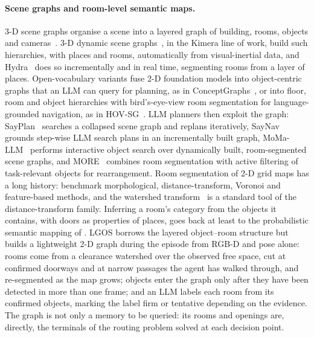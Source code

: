\documentclass[10pt]{article}
\newcommand{\ours}{LGOS\xspace}
\begin{document}
\paragraph{Scene graphs and room-level semantic maps.}
3-D scene graphs organise a scene into a layered graph of building, rooms, objects and
cameras~\citep{armeni20193d}. 3-D dynamic scene graphs~\citep{rosinol20203d}, in the Kimera line of work,
build such hierarchies, with places and rooms, automatically from visual-inertial data, and
Hydra~\citep{hughes2022hydra} does so
incrementally and in real time, segmenting rooms from a layer of places. Open-vocabulary variants fuse 2-D
foundation models into object-centric graphs that an LLM can query for planning, as in
ConceptGraphs~\citep{gu2024conceptgraphs}, or into floor, room and object hierarchies with bird's-eye-view
room segmentation for language-grounded navigation, as in HOV-SG~\citep{werby2024hierarchical}. LLM
planners then exploit the graph: SayPlan~\citep{rana2023sayplan} searches a collapsed scene graph and
replans iteratively, SayNav~\citep{rajvanshi2024saynav} grounds step-wise LLM search plans in an
incrementally built graph, MoMa-LLM~\citep{honerkamp2024language} performs interactive object search over
dynamically built, room-segmented scene graphs, and MORE~\citep{mohammadi2025more} combines room
segmentation with active filtering of task-relevant objects for rearrangement. Room segmentation of 2-D
grid maps has a long history: \citet{bormann2016room} benchmark morphological, distance-transform, Voronoi
and feature-based methods, and the watershed transform~\citep{vincent1991watersheds} is a standard tool of
the distance-transform family. Inferring a room's category from the objects it contains, with doors as
properties of places, goes back at least to the probabilistic semantic mapping of
\citet{pronobis2012large}. \ours borrows the layered object--room structure but builds a lightweight 2-D
graph during the episode from RGB-D and pose alone: rooms come from a clearance watershed over the
observed free space, cut at confirmed doorways and at narrow passages the agent has walked through, and
re-segmented as the map grows; objects enter the graph only after they have been detected in more than
one frame; and an LLM labels each room from its confirmed objects, marking the label firm or tentative
depending on the evidence. The graph is not only a memory to be
queried: its rooms and openings are, directly, the terminals of the routing problem solved at each
decision point.
\end{document}
